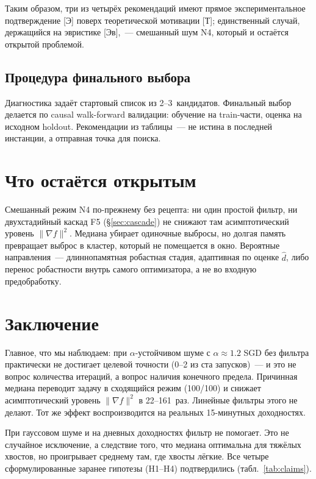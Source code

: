 \documentclass[conference]{IEEEtran}
\begin{document}
Таким образом, три из четырёх рекомендаций имеют прямое экспериментальное
подтверждение [Э] поверх теоретической мотивации [Т]; единственный случай,
держащийся на эвристике [Эв],~--- смешанный шум N4, который и остаётся
открытой проблемой.

\subsection{Процедура финального выбора}

Диагностика задаёт стартовый список из 2--3~кандидатов. Финальный выбор
делается по causal walk-forward валидации: обучение на train-части,
оценка на исходном holdout. Рекомендации из таблицы~--- не
истина в последней инстанции, а отправная точка для поиска.

\section{Что остаётся открытым}
\label{sec:problems}

Смешанный режим N4 по-прежнему без рецепта: ни один простой фильтр, ни
двухстадийный каскад F5 (§\ref{sec:cascade}) не снижают там асимптотический
уровень $\|\nabla f\|^2$. Медиана убирает одиночные выбросы, но долгая
память превращает выброс в кластер, который не помещается в окно. Вероятные
направления~--- длиннопамятная робастная стадия, адаптивная по оценке
$\hat{d}$, либо перенос робастности внутрь самого оптимизатора, а не во
входную предобработку.

\section{Заключение}
\label{sec:conclusion}

Главное, что мы наблюдаем: при $\alpha$-устойчивом шуме с
$\alpha\approx1.2$ SGD без фильтра практически не достигает целевой
точности (0--2 из ста запусков)~--- и это не вопрос количества итераций, а
вопрос наличия конечного предела. Причинная медиана переводит задачу в
сходящийся режим (100/100) и снижает асимптотический уровень $\|\nabla f\|^2$
в 22--161~раз. Линейные фильтры этого не делают. Тот же эффект
воспроизводится на реальных
15-минутных доходностях.

При гауссовом шуме и на дневных доходностях фильтр не помогает.
Это не случайное исключение, а следствие того, что медиана
оптимальна для тяжёлых хвостов, но проигрывает среднему там, где
хвосты лёгкие. Все четыре сформулированные заранее гипотезы (H1--H4)
подтвердились (табл.~\ref{tab:claims}).
\end{document}
